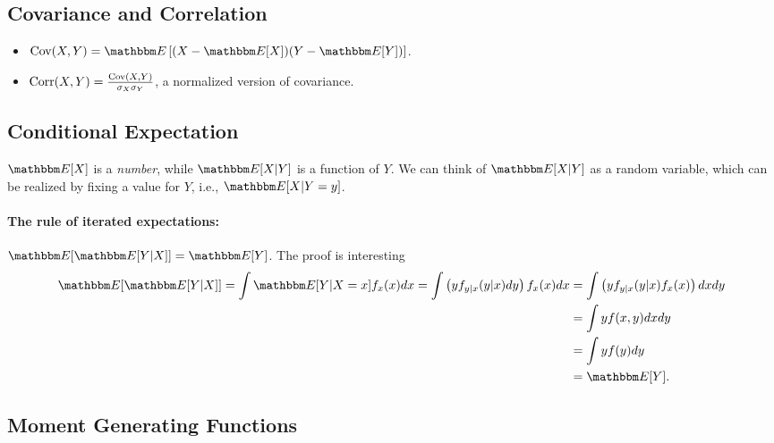 \subsection{Covariance and Correlation}
    \begin{itemize}
        \item $\Cov(X, Y) = \E\left[ (X - \E[X]) (Y - \E[Y])\right]$.
        \item $\text{Corr}(X, Y) = \frac{\text{Cov}(X, Y)}{\sigma_X \sigma_Y}$, a normalized version of covariance.
    \end{itemize}
    
\subsection{Conditional Expectation}
    $\E[X]$ is a \emph{number}, while $\E[X | Y]$ is a function of $Y$.
    We can think of $\E[X|Y]$ as a random variable, which can be realized by fixing a value for $Y$, i.e., $\E[X | Y=y]$.
    \paragraph{The rule of iterated expectations:} $\E[\E[Y | X]] = \E[Y]$.
    The proof is interesting
        \begin{equation}
            \begin{aligned}
                    \E[\E[Y|X]] = \int \E[Y|X=x] f_x(x) dx = \int \left(y f_{y|x}(y|x) dy\right) f_x(x) dx & = \int \left( y f_{y|x}(y|x) f_x(x)\right)dx dy \\
                    & = \int y f(x, y)  dx dy \\
                    & = \int y f(y) dy \\
                    & = \E[Y].
            \end{aligned}
        \end{equation}

\subsection{Moment Generating Functions}
    
    

